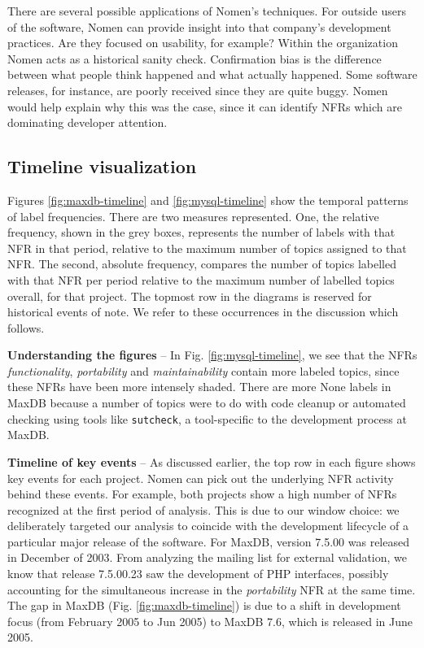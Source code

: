 \documentclass[]{sig-alternate}
\begin{document}
There are several possible applications of \textsf{Nomen}'s techniques. 
For outside users of the software, \textsf{Nomen} can provide insight into that company's development practices. 
Are they focused on usability, for example?
Within the organization \textsf{Nomen} acts as a historical sanity check. 
Confirmation bias is the difference between what people think happened and what actually happened. 
Some software releases, for instance, are poorly received since they are quite buggy. 
\textsf{Nomen} would help explain why this was the case, since it can identify NFRs which are dominating developer attention.

\subsection{Timeline visualization}
Figures \ref{fig:maxdb-timeline} and \ref{fig:mysql-timeline} show the temporal patterns of label frequencies. 
There are two measures represented. 
One, the relative frequency, shown in the grey boxes, represents the number of labels with that NFR in that period, 
relative to the maximum number of topics assigned to that NFR. 
The second, absolute frequency, compares the number of topics labelled with that NFR per period 
relative to the maximum number of labelled topics overall, for that project. The topmost row in the diagrams is reserved for historical events of note. We refer to these occurrences in the discussion which follows.

\textbf{Understanding the figures} -- In Fig. \ref{fig:mysql-timeline}, we see that the NFRs \emph{functionality}, \emph{portability} and \emph{maintainability} contain more labeled topics, since these NFRs have been more intensely shaded. %
There are more \textsf{None} labels in MaxDB because a number of topics were to do with code cleanup or automated checking using tools like \texttt{sutcheck}, a tool-specific to the development process at MaxDB. 

\textbf{Timeline of key events} -- As discussed earlier, the top row in each figure shows key events for each project. \textsf{Nomen} can pick out the underlying NFR activity behind these events. For example, both projects show a high number of NFRs recognized at the first period of analysis. 
This is due to our window choice: we deliberately targeted our analysis to coincide with the development lifecycle of a particular major release of the software. For MaxDB, version 7.5.00  was released in December of 2003. 
From analyzing the mailing list for external validation, we know that release 7.5.00.23 saw the development of PHP interfaces, possibly accounting for the simultaneous increase in the \emph{portability} NFR at the same time.
The gap in MaxDB (Fig. \ref{fig:maxdb-timeline}) is due to a shift in development focus (from February 2005 to Jun 2005) to MaxDB 7.6, which is released in June 2005.
\end{document}
